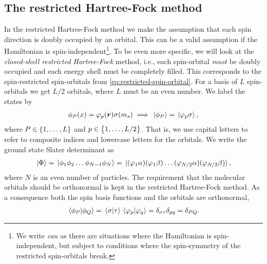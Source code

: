         \subsection{The restricted Hartree-Fock method}
            \label{subsec:rhf}
            In the restricted Hartree-Fock method we make the assumption that
            each spin direction is doubly occupied by an orbital.
            This can be a valid assumption if the Hamiltonian is
            spin-independent\footnote{%
                We write \emph{can} as there are situations where the
                Hamiltonian is spin-independent, but subject to conditions where
                the spin-symmetry of the restricted spin-orbitals break.
            }.
            To be even more specific, we will look at the \emph{closed-shell
            restricted Hartree-Fock} method, i.e., each spin-orbital \emph{must}
            be doubly occupied and each energy shell must be completely filled.
            This corresponds to the spin-restricted spin-orbitals from
            \autoref{eq:restricted-spin-orbital}.
            For a basis of $L$ spin-orbitals we get $L/2$ orbitals, where $L$
            must be an even number.
            We label the states by
            \begin{align}
                \phi_{P}(x) = \varphi_p(\boldsymbol{r}) \sigma(m_s)
                \implies
                \ket*{\phi_P} = \ket*{\varphi_p\sigma},
            \end{align}
            where $P \in \left\{ 1, \dots, L \right\}$ and $p \in \left\{ 1, \dots, L / 2 \right\}$.
            That is, we use capital letters to refer to composite indices and
            lowercase letters for the orbitals.
            We write the ground state Slater determinant as
            \begin{align}
                \ket*{\Phi} = \ket*{\phi_1 \phi_2 \dots \phi_{N - 1} \phi_N}
                = \ket*{
                    (\varphi_1 \alpha)
                    (\varphi_1 \beta)
                    \dots
                    (\varphi_{N / 2} \alpha)
                    (\varphi_{N / 2}\beta)
                },
            \end{align}
            where $N$ is an even number of particles.
            The requirement that the molecular orbitals should be orthonormal is
            kept in the restricted Hartree-Fock method.
            As a consequence both the spin basis functions and the orbitals are
            orthonormal,
            \begin{align}
                \braket*{\phi_P}{\phi_Q}
                = \braket*{\sigma}{\tau}
                \braket*{\varphi_p}{\varphi_q}
                = \delta_{\sigma \tau}
                \delta_{pq}
                = \delta_{PQ}.
            \end{align}
